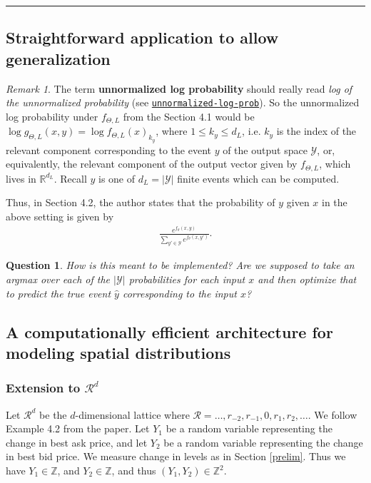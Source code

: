 \documentclass[12pt, reqno]{amsart}
\theoremstyle{definition}
\theoremstyle{definition}
\theoremstyle{plain}
\newtheorem{Ques}[theorem]{Question}
\theoremstyle{definition}
\theoremstyle{remark}
\newtheorem{rem}[theorem]{Remark}
\newcommand{\R}{\mathbb{R}}				%
\newcommand{\z}{\mathbb{Z}}				%
\newcommand{\bee}{\begin{equation}\begin{aligned}}
\newcommand{\eee}{\end{aligned}\end{equation}}
\newcommand{\fracc}{\frac}				%
\newcommand{\counter}{\setcounter}			%
\renewcommand{\leq}{\leqslant}			%
\renewcommand{\'}{\hspace{0.5mm}'}			%
\newcommand{\hrul}{\vspace{3mm}\hrule\vspace{3mm}}
\begin{document}
\hrul 


\subsection{Straightforward application to allow generalization}

\begin{rem}
	The term \textbf{unnormalized log probability} should really read \textit{log of the unnormalized probability} (see \href{https://datascience.stackexchange.com/questions/47460/unnormalized-log-probability-rnn}{\texttt{unnormalized-log-prob}}). So the unnormalized log probability under $f_{\Theta, L}$ from the Section 4.1 would be $\log g_{\Theta,L}(x,y) = \log f_{\Theta, L}(x)_{k_y}$, where $1 \leq k_y \leq d_L$, i.e. $k_y$ is the index of the relevant component corresponding to the event $y$ of the output space $\mathcal{Y}$, or, equivalently, the relevant component of the output vector given by $f_{\Theta, L}$, which lives in $\R^{d_L}$. Recall $y$ is one of $d_L = |\mathcal{Y}|$ finite events which can be computed. 
\end{rem}

Thus, in Section 4.2, the author states that the probability of $y$ given $x$ in the above setting is given by
\bee
	\fracc{
		e^{f_\theta(x,y)}
	}{
		\sum_{y' \in \mathcal{Y}} e^{f_\theta(x,y')}
	}. 
\eee

\begin{Ques}
	How is this meant to be implemented? Are we supposed to take an argmax over each of the $|\mathcal{Y}|$ probabilities for each input $x$ and then optimize that to predict the true event $\hat{y}$ corresponding to the input $x$? 
\end{Ques}

\counter{subsection}{2}
\subsection{A computationally efficient architecture for modeling spatial distributions}

\subsubsection{Extension to $\mathcal{R}^d$}

Let $\mathcal{R}^d$ be the $d$-dimensional lattice where $\mathcal{R} = \ldots, r_{-2}, r_{-1}, 0, r_1, r_2, \ldots$. We follow Example 4.2 from the paper. Let $Y_1$ be a random variable representing the change in best ask price, and let $Y_2$ be a random variable representing the change in best bid price. We measure change in levels as in Section \ref{prelim}. Thus we have $Y_1 \in \z$, and $Y_2 \in \z$, and thus $(Y_1, Y_2) \in \z^2$. 
\end{document}

